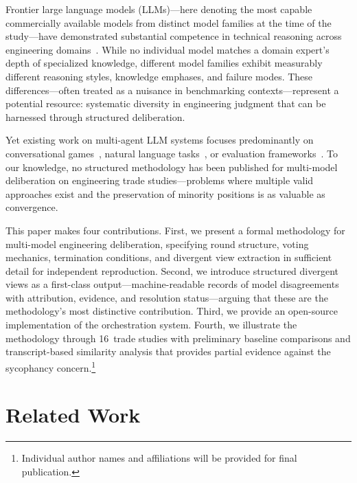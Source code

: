 \documentclass[11pt,a4paper]{article}
\begin{document}
Frontier large language models (LLMs)---here denoting the most capable commercially available models from distinct model families at the time of the study---have demonstrated substantial competence in technical reasoning across engineering domains~\cite{bubeck2023sparks,openai2024gpt4}. While no individual model matches a domain expert's depth of specialized knowledge, different model families exhibit measurably different reasoning styles, knowledge emphases, and failure modes. These differences---often treated as a nuisance in benchmarking contexts---represent a potential resource: systematic diversity in engineering judgment that can be harnessed through structured deliberation.

Yet existing work on multi-agent LLM systems focuses predominantly on conversational games~\cite{du2023debate}, natural language tasks~\cite{wu2023autogen}, or evaluation frameworks~\cite{zheng2024judging}. To our knowledge, no structured methodology has been published for multi-model deliberation on engineering trade studies---problems where multiple valid approaches exist and the preservation of minority positions is as valuable as convergence.

This paper makes four contributions. First, we present a formal methodology for multi-model engineering deliberation, specifying round structure, voting mechanics, termination conditions, and divergent view extraction in sufficient detail for independent reproduction. Second, we introduce structured divergent views as a first-class output---machine-readable records of model disagreements with attribution, evidence, and resolution status---arguing that these are the methodology's most distinctive contribution. Third, we provide an open-source implementation of the orchestration system. Fourth, we illustrate the methodology through 16~trade studies with preliminary baseline comparisons and transcript-based similarity analysis that provides partial evidence against the sycophancy concern.\footnote{Individual author names and affiliations will be provided for final publication.}

\section{Related Work}
\label{sec:related}
\end{document}
